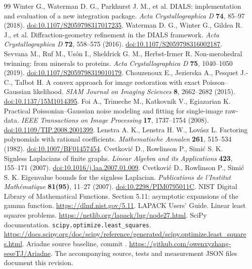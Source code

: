 \documentclass[UTF8,11pt,a4paper,fontset=fandol]{ctexart}
\begin{document}
\begin{thebibliography}{99}
Winter G., Waterman D. G., Parkhurst J. M., et al.
DIALS: implementation and evaluation of a new integration package.
\emph{Acta Crystallographica D} \textbf{74}, 85--97 (2018).
\href{https://doi.org/10.1107/S2059798317017235}{doi:10.1107/S2059798317017235}.
Waterman D. G., Winter G., Gildea R. J., et al.
Diffraction-geometry refinement in the DIALS framework.
\emph{Acta Crystallographica D} \textbf{72}, 558--575 (2016).
\href{https://doi.org/10.1107/S2059798316002187}{doi:10.1107/S2059798316002187}.
Sevvana M., Ruf M., Usón I., Sheldrick G. M., Herbst-Irmer R.
Non-merohedral twinning: from minerals to proteins.
\emph{Acta Crystallographica D} \textbf{75}, 1040--1050 (2019).
\href{https://doi.org/10.1107/S2059798319010179}{doi:10.1107/S2059798319010179}.
Chouzenoux E., Jezierska A., Pesquet J.-C., Talbot H.
A convex approach for image restoration with exact Poisson--Gaussian likelihood.
\emph{SIAM Journal on Imaging Sciences} \textbf{8}, 2662--2682 (2015).
\href{https://doi.org/10.1137/15M1014395}{doi:10.1137/15M1014395}.
Foi A., Trimeche M., Katkovnik V., Egiazarian K.
Practical Poissonian--Gaussian noise modeling and fitting for single-image raw-data.
\emph{IEEE Transactions on Image Processing} \textbf{17}, 1737--1754 (2008).
\href{https://doi.org/10.1109/TIP.2008.2001399}{doi:10.1109/TIP.2008.2001399}.
Lenstra A. K., Lenstra H. W., Lovász L.
Factoring polynomials with rational coefficients.
\emph{Mathematische Annalen} \textbf{261}, 515--534 (1982).
\href{https://doi.org/10.1007/BF01457454}{doi:10.1007/BF01457454}.
Cvetković D., Rowlinson P., Simić S. K.
Signless Laplacians of finite graphs.
\emph{Linear Algebra and its Applications} \textbf{423}, 155--171 (2007).
\href{https://doi.org/10.1016/j.laa.2007.01.009}{doi:10.1016/j.laa.2007.01.009}.
Cvetković D., Rowlinson P., Simić S. K.
Eigenvalue bounds for the signless Laplacian.
\emph{Publications de l'Institut Mathématique} \textbf{81(95)}, 11--27 (2007).
\href{https://doi.org/10.2298/PIM0795011C}{doi:10.2298/PIM0795011C}.
NIST Digital Library of Mathematical Functions.
Section 5.11: asymptotic expansions of the gamma function.
\url{https://dlmf.nist.gov/5.11}.
LAPACK Users' Guide. Linear least squares problems.
\url{https://netlib.org/lapack/lug/node27.html}.
SciPy documentation. \texttt{scipy.optimize.least\_squares}.
\url{https://docs.scipy.org/doc/scipy/reference/generated/scipy.optimize.least_squares.html}.
Ariadne source baseline, commit
.
\url{https://github.com/owenxyzhang-seseTJ/Ariadne}.
The accompanying source, tests and measurement JSON files document this revision.
\end{thebibliography}
\end{document}
